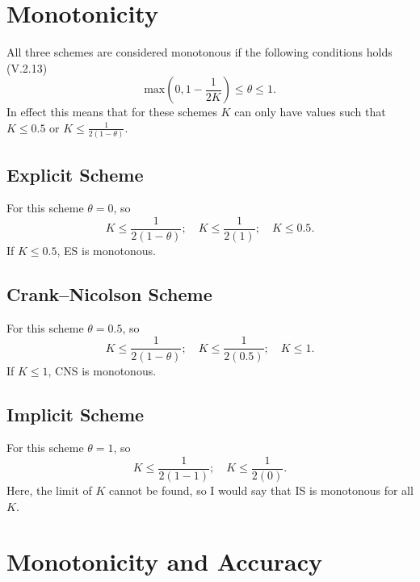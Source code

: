 \documentclass[a4paper, 12pt, reqno]{article}
\begin{document}
\section{Monotonicity}

All three schemes are considered monotonous if the following conditions holds
(V.2.13)
\begin{equation}\nonumber
    \text{max}\left(0, 1-\frac{1}{2K}\right) \le \theta \le 1.
\end{equation}
In effect this means that for these schemes $K$ can only have values such that
$K \le 0.5$ or $K \le \frac{1}{2(1-\theta)}$.

\subsection{Explicit Scheme}

For this scheme $\theta = 0$, so
\begin{equation}\nonumber
    K \le \frac{1}{2(1-\theta)}; \quad
    K \le \frac{1}{2(1)}; \quad
    K \le 0.5.
\end{equation}
If $K \le 0.5$, ES is monotonous.

\subsection{Crank--Nicolson Scheme}

For this scheme $\theta = 0.5$, so
\begin{equation}\nonumber
    K \le \frac{1}{2(1-\theta)}; \quad
    K \le \frac{1}{2(0.5)}; \quad
    K \le 1.
\end{equation}
If $K \le 1$, CNS is monotonous.

\subsection{Implicit Scheme}

For this scheme $\theta = 1$, so
\begin{equation}\nonumber
    K \le \frac{1}{2(1-1)}; \quad
    K \le \frac{1}{2(0)}.
\end{equation}
Here, the limit of $K$ cannot be found, so I would say that IS is monotonous
for all $K$.

\section{Monotonicity and Accuracy}
\end{document}

